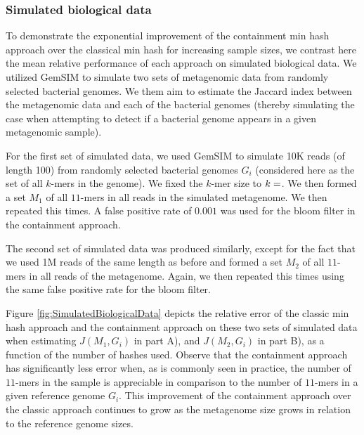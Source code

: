 \documentclass[11pt,reqno]{amsart}
\theoremstyle{remark}
\numberwithin{equation}{section}
\newcommand{\SimulatedBiologicalDataNumReplicates}{\protect }
\newcommand{\SimulatedBiologicalDataSmallKsize}{\protect }
\newcommand{\SimulatedBiologicalDataSmallNumGenomes}{\protect }
\newcommand{\SimulatedBiologicalDataSmallNumReplicates}{\protect }
\newcommand{\SimulatedBiologicalDataSmallRelSize}{\protect }
\begin{document}
\subsubsection{Simulated biological data}
To demonstrate the exponential improvement of the containment min hash approach over the classical min hash for increasing sample sizes, we contrast here the mean relative performance of each approach on simulated biological data. We utilized GemSIM \cite{mcelroy2012gemsim} to simulate two sets of metagenomic data from randomly selected bacterial genomes. We them aim to estimate the Jaccard index between the metagenomic data and each of the bacterial genomes (thereby simulating the case when attempting to detect if a bacterial genome appears in a given metagenomic sample).

For the first set of simulated data, we used GemSIM to simulate 10K reads (of length 100) from \SimulatedBiologicalDataSmallNumGenomes randomly selected bacterial genomes $G_i$ (considered here as the set of all $k$-mers in the genome). We fixed the $k$-mer size to $k=\SimulatedBiologicalDataSmallKsize$. We then formed a set $M_1$ of all $11$-mers in all reads in the simulated metagenome. We then repeated this \SimulatedBiologicalDataSmallNumReplicates times. A false positive rate of $0.001$ was used for the bloom filter in the containment approach.

The second set of simulated data was produced similarly, except for the fact that we used 1M reads of the same length as before and formed a set $M_2$ of all $11$-mers in all reads of the metagenome. Again, we then repeated this \SimulatedBiologicalDataNumReplicates times using the same false positive rate for the bloom filter.

 
 
Figure \ref{fig:SimulatedBiologicalData} depicts the relative error of the classic min hash approach and the containment approach on these two sets of simulated data when estimating $J(M_1,G_i)$ in part A), and $J(M_2,G_i)$ in part B), as a function of the number of hashes used. Observe that the containment approach has significantly less error when, as is commonly seen in practice, the number of $11$-mers in the sample is appreciable in comparison to the number of $11$-mers in a given reference genome $G_i$. This improvement of the containment approach over the classic approach continues to grow as the metagenome size grows in relation to the reference genome sizes.
\end{document}
